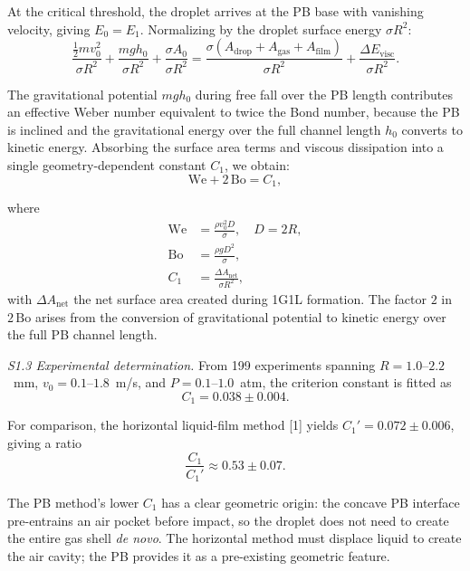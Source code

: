 \documentclass[%
 preprint,
 superscriptaddress,
 amsmath,amssymb,
 aps, prl,
]{revtex4-2}
\begin{document}
At the critical threshold, the droplet arrives at the PB base with vanishing velocity, giving $E_0 = E_1$. Normalizing by the droplet surface energy $\sigma R^2$:
\begin{equation}
\frac{\frac{1}{2} m v_0^2}{\sigma R^2} + \frac{m g h_0}{\sigma R^2} + \frac{\sigma A_0}{\sigma R^2}
= \frac{\sigma (A_{\text{drop}} + A_{\text{gas}} + A_{\text{film}})}{\sigma R^2} + \frac{\Delta E_{\text{visc}}}{\sigma R^2}.
\label{eq:s1_normalized}
\end{equation}

The gravitational potential $m g h_0$ during free fall over the PB length contributes an effective Weber number equivalent to twice the Bond number, because the PB is inclined and the gravitational energy over the full channel length $h_0$ converts to kinetic energy. Absorbing the surface area terms and viscous dissipation into a single geometry-dependent constant $C_1$, we obtain:
\begin{equation}
\boxed{\text{We} + 2\,\text{Bo} = C_1},
\label{eq:s1_webo}
\end{equation}

where
\begin{align}
\text{We} &= \frac{\rho v_0^2 D}{\sigma}, \quad D = 2R, \\
\text{Bo}  &= \frac{\rho g D^2}{\sigma}, \\
C_1 &= \frac{\Delta A_{\text{net}}}{\sigma R^2},
\end{align}
with $\Delta A_{\text{net}}$ the net surface area created during 1G1L formation. The factor $2$ in $2\,\text{Bo}$ arises from the conversion of gravitational potential to kinetic energy over the full PB channel length.\par

{\noindent\textit{S1.3 Experimental determination.}}
From 199 experiments spanning $R = 1.0$--$2.2$~mm, $v_0 = 0.1$--$1.8$~m/s, and $P = 0.1$--$1.0$~atm, the criterion constant is fitted as
\begin{equation}
C_1 = 0.038 \pm 0.004.
\end{equation}

For comparison, the horizontal liquid-film method [1] yields $C_1' = 0.072 \pm 0.006$, giving a ratio
\begin{equation}
\frac{C_1}{C_1'} \approx 0.53 \pm 0.07.
\end{equation}

The PB method's lower $C_1$ has a clear geometric origin: the concave PB interface pre-entrains an air pocket before impact, so the droplet does not need to create the entire gas shell \textit{de novo}. The horizontal method must displace liquid to create the air cavity; the PB provides it as a pre-existing geometric feature.\par
\end{document}
